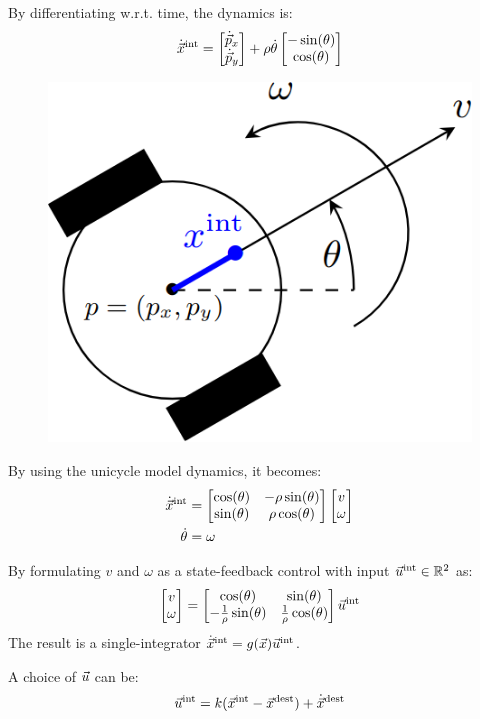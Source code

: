 \begin{description}
        By differentiating w.r.t. time, the dynamics is:
        \[
            \dot{{\vec{x}}}^\text{int} = \begin{bmatrix}
                \dot{\vec{p}}_x \\ \dot{\vec{p}}_y
            \end{bmatrix}
            +
            \rho \dot{\theta} \begin{bmatrix}
                - \sin(\theta) \\ \cos(\theta)
            \end{bmatrix}
        \]

        \begin{figure}[H]
            \centering
            \includegraphics[width=0.2\linewidth]{./img/single_unicycle_map.png}
        \end{figure}

        By using the unicycle model dynamics, it becomes:
        \[
            \begin{split}
                \dot{{\vec{x}}}^\text{int} &= \begin{bmatrix}
                    \cos(\theta) & -\rho\sin(\theta) \\
                    \sin(\theta) & \rho\cos(\theta) \\
                \end{bmatrix}
                \begin{bmatrix}
                    v \\ \omega
                \end{bmatrix} \\
                \dot{\theta} &= \omega
            \end{split}
        \]

        By formulating $v$ and $\omega$ as a state-feedback control with input ${\vec{u}}^\text{int} \in \mathbb{R}^2$ as:
        \[
            \begin{bmatrix}
                v \\ \omega
            \end{bmatrix}
            =
            \begin{bmatrix}
                \cos(\theta) & \sin(\theta) \\
                -\frac{1}{\rho} \sin(\theta) & \frac{1}{\rho} \cos(\theta)
            \end{bmatrix} {\vec{u}}^\text{int}
        \]
        The result is a single-integrator $\dot{{\vec{x}}}^\text{int} = g({\vec{x}}){\vec{u}}^\text{int}$.

        A choice of ${\vec{u}}$ can be:
        \[
            {\vec{u}}^\text{int} = k ({\vec{x}}^\text{int} - {\vec{x}}^\text{dest}) + \dot{{\vec{x}}}^\text{dest}
        \]
\end{description}